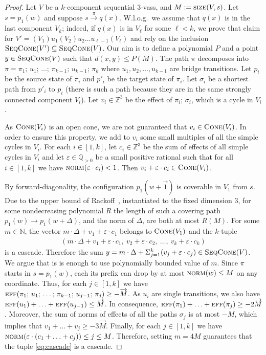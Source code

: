 \documentclass[a4paper, UKenglish, cleveref, autoref, thm-restate]{lipics-v2021}
\newcommand{\N}{\mathbb{N}}
\newcommand{\Z}{\mathbb{Z}}
\newcommand{\Q}{\mathbb{Q}}
\newcommand{\trans}[1]{\stackrel{#1}{\longrightarrow}}
\newcommand{\norm}{\textsc{norm}}
\newcommand{\size}{\textsc{size}}
\newcommand{\eff}{\textsc{eff}}
\newcommand{\eps}{\varepsilon}
\renewcommand{\vec}[1]{\overrightarrow{#1}}
\newcommand{\vass}{{\sc vass}\xspace}
\newcommand{\tvass}{\parvass 3}
\newcommand{\parvass}[1]{{$#1$-\vass}\xspace}
\newcommand{\ltvass}{(V_1) u_1 (V_2) u_2 \ldots u_{\ell-1} (V_\ell)}
\newcommand{\setfromto}[2]{[#1, #2]}
\newcommand{\setto}[1]{\setfromto 1 {#1}}
\newcommand{\Wlog}{W.l.o.g.~}
\newcommand{\cone}[1]{\textsc{Cone}(#1)}
\newcommand{\seqcone}[1]{\textsc{SeqCone}(#1)}
\begin{document}
\begin{proof}
Let $V$ be a $k$-component sequential \tvass, and $M:=\size(V, s)$.
Let $s=p_1(w)$ and suppose $s \trans{\pi} q(x)$.
\Wlog we assume that $q(x)$ is in the last component $V_k$; indeed, if $q(x)$ is in $V_\ell$ for some
$\ell < k$, we prove that claim for $V'=\ltvass$ and rely on the inclusion
$\seqcone {V'} \subseteq \seqcone V$.
Our aim is to define a polynomial $P$ and a point $y \in \seqcone{V}$ such that $d(x,y) \leq P(M)$.
The path $\pi$ decomposes into $\pi = \pi_1;\, u_1;\, \ldots; \, \pi_{k-1}; \, u_{k-1}; \, \pi_k$ where 
$u_1, u_2, \ldots, u_{k-1}$ are bridge transitions.
Let $p_i$ be the source state of $\pi_i$ and $p'_i$ be the target state of $\pi_i$.
Let $\sigma_i$ be a shortest path from $p'_i$ to $p_i$ 
(there is such a path because they are in the same strongly connected component $V_i$). 
Let $v_i \in \Z^3$ be the effect of $\pi_i;\, \sigma_i$, which is a cycle in $V_i$. 

As $\cone{V_i}$ is an open cone, we are not guaranteed that $v_i \in \cone{V_i}$. 
In order to ensure this property, we add to $v_i$ some small multiples of all the simple cycles in $V_i$.
For each $i \in \setto k$, let $c_i\in\Z^3$ 
be the sum of effects of all simple cycles in $V_i$ and let 
$\eps \in \Q_{>0}$ be a small positive rational such that for all $i \in \setto k$ we have $\norm(\eps \cdot c_i) < 1$. 
Then $v_i + \eps \cdot c_i \in \cone{V_i}$.

By forward-diagonality, the configuration $p_1(w+\vec 1)$ is coverable in $V_1$ from $s$.
Due to the upper bound of Rackoff~\cite[Lemma 3.4]{DBLP:journals/tcs/Rackoff78}, instantiated to the
fixed dimension 3,
for some nondecreasing polynomial $R$ the length of such a covering path $p_1(w) \trans{} p_1(w + \Delta)$,
and the norm of $\Delta$, are both at most $R(M)$.
For some $m \in \N$, the vector $m \cdot \Delta + v_1 + \eps \cdot c_1$ 
belongs to $\cone{V_1}$ and the $k$-tuple
\begin{align} \label{eq:cascade}
(m \cdot \Delta + v_1 + \eps \cdot c_1, \ v_2 + \eps \cdot c_2, \ \ldots, \ v_k + \eps \cdot c_k)
\end{align}
is a cascade.
Therefore the sum $y = m \cdot \Delta + \Sigma_{j=1}^k (v_j + \eps\cdot c_j) \in \seqcone V$.
We argue that is is enough to use polynomially bounded value of $m$.
Since $\pi$ starts in $s=p_1(w)$, each its prefix can drop by at most $\norm(w) \leq M$ on any coordinate.
Thus, for each $j \in \setto k$ we have 
$\eff(\pi_1;\, u_1;\, \ldots; \, \pi_{k-1}; \, u_{j-1}; \, \pi_j) \geq -\vec{M}$.
As $u_i$ are single transitions, we also have
$\eff(u_1) + \ldots + \eff(u_{j-1}) \leq \vec{M}$. 
In consequence, $\eff(\pi_1) + \ldots + \eff(\pi_j) \geq -2\vec{M}$.
Moreover, the sum of norms of effects of all the paths $\sigma_j$ is at most $-M$, 
which implies that 
$v_1 + \ldots + v_{j} \geq -3\vec{M}$. 
Finally,
for each $j \in \setto k$ we have 
$\norm(\eps \cdot (c_1 + \ldots + c_j)) \leq j \leq M$. 
Therefore, setting $m = 4M$ guarantees that
the tuple \eqref{eq:cascade} is a cascade.


\end{proof}
\end{document}
